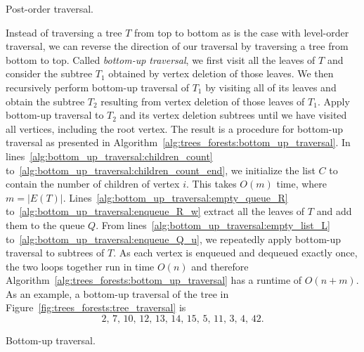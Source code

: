 \begin{algorithm}[!htbp]

\caption{Post-order traversal.}
\label{alg:trees_forests:post_order_traversal}
\end{algorithm}

Instead of traversing a tree $T$ from top to bottom as is the case
with level-order traversal, we can
reverse the direction of our traversal by traversing a tree from
bottom to top. Called
\emph{bottom-up traversal}, we first visit
all the leaves of $T$ and consider the subtree $T_1$
obtained by vertex deletion of those
leaves. We then recursively perform
bottom-up traversal of $T_1$ by visiting
all of its leaves and obtain the subtree $T_2$ resulting from
vertex deletion of those leaves of $T_1$. Apply
bottom-up traversal to $T_2$ and its vertex
deletion subtrees until we have visited all vertices, including the
root vertex. The result is a procedure for bottom-up traversal as
presented in Algorithm~\ref{alg:trees_forests:bottom_up_traversal}. In
lines~\ref{alg:bottom_up_traversal:children_count}
to~\ref{alg:bottom_up_traversal:children_count_end}, we initialize the
list $C$ to contain the number of children of vertex $i$. This takes
$O(m)$ time, where $m =
|E(T)|$. Lines~\ref{alg:bottom_up_traversal:empty_queue_R}
to~\ref{alg:bottom_up_traversal:enqueue_R_w} extract all the leaves
of $T$ and add them to the queue $Q$. From
lines~\ref{alg:bottom_up_traversal:empty_list_L}
to~\ref{alg:bottom_up_traversal:enqueue_Q_u}, we repeatedly apply
bottom-up traversal to subtrees of $T$. As
each vertex is enqueued and
dequeued exactly once, the two loops together run
in time $O(n)$ and therefore
Algorithm~\ref{alg:trees_forests:bottom_up_traversal} has a runtime of
$O(n + m)$. As an example, a bottom-up
traversal of the tree in Figure~\ref{fig:trees_forests:tree_traversal}
is
\[
2,\, 7,\, 10,\, 12,\, 13,\, 14,\, 15,\, 5,\, 11,\, 3,\, 4,\, 42.
\]

\begin{algorithm}[!htbp]

\caption{Bottom-up traversal.}
\label{alg:trees_forests:bottom_up_traversal}
\end{algorithm}

